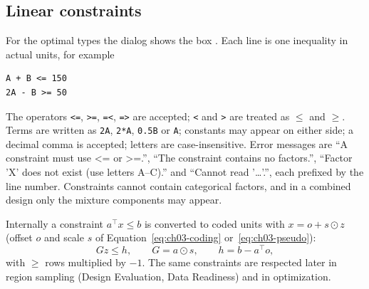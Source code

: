 \subsection{Linear constraints}
\label{sec:ch03-constraints}
For the optimal types the dialog shows the box . Each line is one inequality in actual units, for example
\begin{verbatim}
A + B <= 150
2A - B >= 50
\end{verbatim}
The operators \texttt{<=}, \texttt{>=}, \texttt{=<}, \texttt{=>} are accepted; \texttt{<} and \texttt{>} are
treated as $\le$ and $\ge$. Terms are written as \texttt{2A}, \texttt{2*A}, \texttt{0.5B} or \texttt{A};
constants may appear on either side; a decimal comma is accepted; letters are case-insensitive. Error messages are
``A constraint must use <= or >=.'', ``The constraint contains no factors.'', ``Factor 'X' does not exist (use
letters A--C).'' and ``Cannot read '\dots'.'', each prefixed by the line number. Constraints cannot contain
categorical factors, and in a combined design only the mixture components may appear.

Internally a constraint $a^\top x \le b$ is converted to coded units with $x = o + s \odot z$ (offset $o$ and scale
$s$ of Equation~\ref{eq:ch03-coding} or~\ref{eq:ch03-pseudo}):
\begin{equation}
G z \le h, \qquad G = a \odot s, \qquad h = b - a^\top o,
\label{eq:ch03-constraint}
\end{equation}
with $\ge$ rows multiplied by $-1$. The same constraints are respected later in region sampling (Design Evaluation,
Data Readiness) and in optimization.

